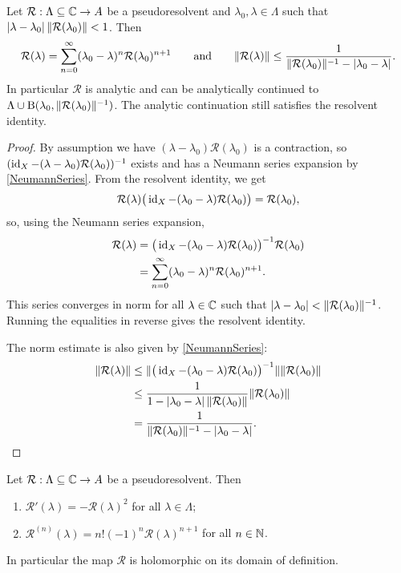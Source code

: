 \begin{proposition} \label{firstNeumannSeries}
Let $\mathcal{R}:\Lambda \subseteq \mathbb{C} \to A$ be a pseudoresolvent and $\lambda_0,\lambda\in\Lambda$ such that $|\lambda-\lambda_0|\,\lVert\mathcal{R}(\lambda_0)\rVert < 1$. Then
\[ \mathcal{R}(\lambda) = \sum_{n=0}^\infty(\lambda_0 - \lambda)^n \mathcal{R}(\lambda_0)^{n+1} \qquad\text{and}\qquad \lVert\mathcal{R}(\lambda)\rVert \leq \frac{1}{\lVert\mathcal{R}(\lambda_0)\rVert^{-1} - |\lambda_0-\lambda|}. \]
In particular $\mathcal{R}$ is analytic and can be analytically continued to $\Lambda \cup \operatorname{B}(\lambda_0, \lVert\mathcal{R}(\lambda_0)\rVert^{-1})$. The analytic continuation still satisfies the resolvent identity.
\end{proposition}
\begin{proof}
By assumption we have $(\lambda - \lambda_0)\mathcal{R}(\lambda_0)$ is a contraction, so $(\operatorname{id}_X - (\lambda - \lambda_0)\mathcal{R}(\lambda_0))^{-1}$ exists and has a Neumann series expansion by \ref{NeumannSeries}. From the resolvent identity, we get
\[ \mathcal{R}(\lambda)\big(\operatorname{id}_X - (\lambda_0 - \lambda)\mathcal{R}(\lambda_0)\big) = \mathcal{R}(\lambda_0), \]
so, using the Neumann series expansion,
\begin{align*}
\mathcal{R}(\lambda) &= \big(\operatorname{id}_X - (\lambda_0 - \lambda)\mathcal{R}(\lambda_0)\big)^{-1}\mathcal{R}(\lambda_0) \\
&= \sum_{n=0}^\infty(\lambda_0 - \lambda)^n \mathcal{R}(\lambda_0)^{n+1}.
\end{align*}
This series converges in norm for all $\lambda\in \mathbb{C}$ such that $|\lambda-\lambda_0| < \lVert\mathcal{R}(\lambda_0)\rVert^{-1}$. Running the equalities in reverse gives the resolvent identity.

The norm estimate is also given by \ref{NeumannSeries}:
\begin{align*}
\lVert\mathcal{R}(\lambda)\rVert &\leq \lVert\big(\operatorname{id}_X - (\lambda_0 - \lambda)\mathcal{R}(\lambda_0)\big)^{-1}\rVert\lVert\mathcal{R}(\lambda_0)\rVert \\
&\leq \frac{1}{1 - |\lambda_0-\lambda|\,\lVert\mathcal{R}(\lambda_0)\rVert}\lVert\mathcal{R}(\lambda_0)\rVert \\
&= \frac{1}{\lVert\mathcal{R}(\lambda_0)\rVert^{-1} - |\lambda_0-\lambda|}.
\end{align*}
\end{proof}
\begin{corollary} \label{derivativePseudoresolvent}
Let $\mathcal{R}:\Lambda \subseteq \mathbb{C} \to A$ be a pseudoresolvent. Then
\begin{enumerate}
\item $\mathcal{R}'(\lambda) = -\mathcal{R}(\lambda)^2$ for all $\lambda\in\Lambda$;
\item $\mathcal{R}^{(n)}(\lambda) = n!(-1)^n \mathcal{R}(\lambda)^{n+1}$ for all $n\in \mathbb{N}$.
\end{enumerate}
In particular the map $\mathcal{R}$ is holomorphic on its domain of definition.
\end{corollary}

